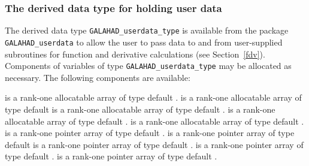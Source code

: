 \subsubsection{The derived data type for holding user data}\label{typeuserdata}
The derived data type {\tt GALAHAD\_user\-data\_type}
is available from the package {\tt GALAHAD\_user\-data}
to allow the user to pass data to and from user-supplied
subroutines for function and derivative calculations (see Section~\ref{fdv}).
Components of variables of type {\tt GALAHAD\_user\-data\_type} may be 
allocated as necessary. The following components are available:

\begin{description}
 is a rank-one allocatable array of type default \integer.
 is a rank-one allocatable array of type default  \realdp
{} is a rank-one allocatable array of type default \complexdp.
 is a rank-one allocatable array of type default \character.
 is a rank-one allocatable array of type default \logical.
 is a rank-one pointer array of type default \integer.
 is a rank-one pointer array of type default  \realdp
{} is a rank-one pointer array of type default \complexdp.
 is a rank-one pointer array of type default \character.
 is a rank-one pointer array of type default \logical.
\end{description}
